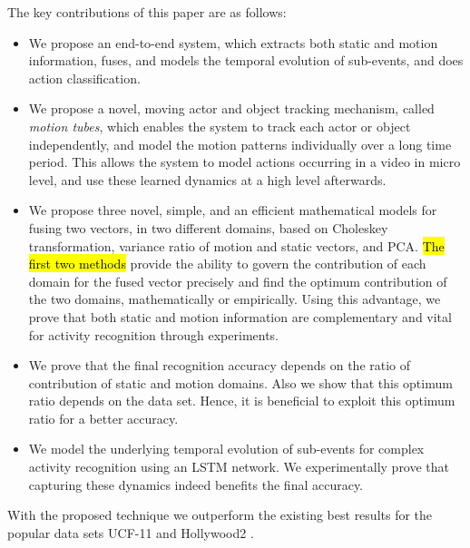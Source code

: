 The key contributions of this paper are as follows:

 \begin{itemize}
  \item We propose an end-to-end system, which  extracts both static and motion information, fuses, and models the
temporal evolution of sub-events, and does action classification.
  \item We propose a novel, moving actor and object tracking mechanism, called \textit{motion tubes},
which enables the system to track each actor or object independently, and model the motion patterns individually over a long time period.
This allows the system to model actions occurring in a video in micro level, and use these learned dynamics
at a high level afterwards.
 \item We propose three novel, simple, and an efficient mathematical models for fusing two vectors,
in two different domains, based on Choleskey transformation, variance ratio of motion and static vectors, and PCA. \hl{The first two methods} provide
the ability to govern the contribution of each domain for the fused vector precisely and find the optimum contribution of the two domains, mathematically or empirically. Using this advantage, we prove that both static and motion information are complementary and vital for activity recognition through experiments.
 \item We prove that the final recognition accuracy depends on the ratio of contribution of static and motion domains. Also we show that
 this optimum ratio depends on the data set. Hence, it is beneficial to exploit this optimum ratio for a better accuracy.
  \item We model the underlying temporal evolution of sub-events for complex activity recognition using an LSTM network. We experimentally
prove that capturing these dynamics indeed benefits the final accuracy.
 \end{itemize}

With the proposed technique
we outperform the existing best results for the popular data sets UCF-11 \cite{liu2009recognizing}
and Hollywood2 \cite{marszalek2009actions}.


